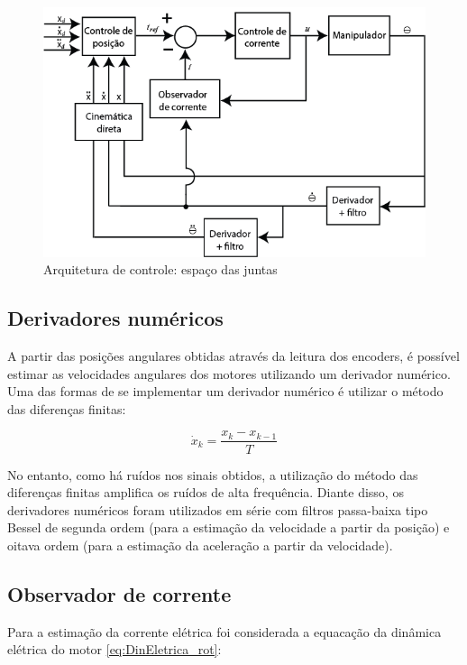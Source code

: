 \documentclass[]{politex}
\begin{document}
\begin{figure}[H]
    \centering
    \includegraphics[scale=0.5]{imagens/ControleEspacoDaTarefa.png}
    \caption{Arquitetura de controle: espaço das juntas}
    \label{fig:ControleEspacoDaTarefa}
\end{figure}

\subsection{Derivadores numéricos}
\label{derivador}

A partir das posições angulares obtidas através da leitura dos encoders, é possível estimar as velocidades angulares dos motores utilizando um derivador numérico. Uma das formas de se implementar um derivador numérico é utilizar o método das diferenças finitas:

\begin{equation}
\dot{x}_k = \frac{x_k - x_{k-1}}{T}
\end{equation}

No entanto, como há ruídos nos sinais obtidos, a utilização  do método das diferenças finitas amplifica os ruídos de alta frequência. Diante disso, os derivadores numéricos foram utilizados em série com filtros passa-baixa tipo Bessel de segunda ordem (para a estimação da velocidade a partir da posição) e oitava ordem (para a estimação da aceleração a partir da velocidade).

\subsection{Observador de corrente}

Para a estimação da corrente elétrica foi considerada a equacação da dinâmica elétrica do motor \eqref{eq:DinEletrica_rot}:
\end{document}
